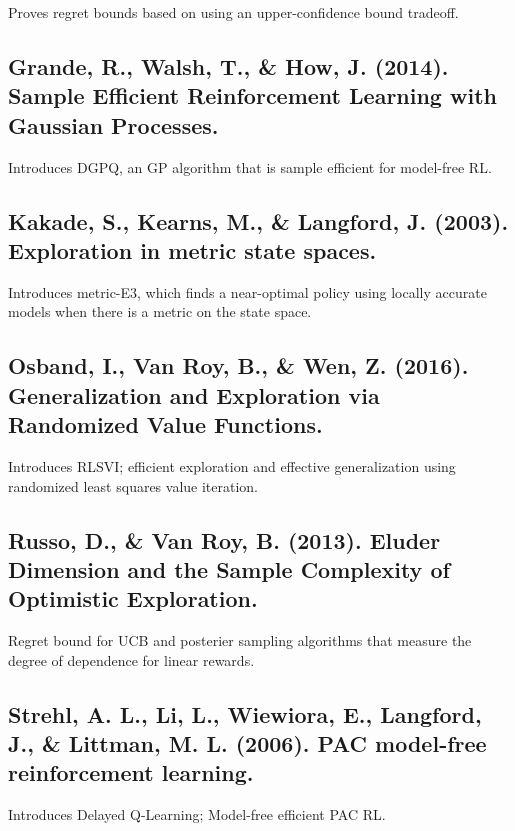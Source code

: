 \documentclass[12pt, oneside]{amsart}
\begin{document}
Proves regret bounds based on using an upper-confidence bound tradeoff.

\subsection*{Grande, R., Walsh, T., \& How, J. (2014). Sample Efficient Reinforcement Learning with Gaussian Processes.}
Introduces DGPQ, an GP algorithm that is sample efficient for model-free  RL.

\subsection*{Kakade, S., Kearns, M., \& Langford, J. (2003). Exploration in metric state spaces.}
Introduces metric-E3, which finds a near-optimal policy using locally accurate models when there is a metric on the state space.

\subsection*{Osband, I., Van Roy, B., \& Wen, Z. (2016). Generalization and Exploration via Randomized Value Functions.}
Introduces RLSVI; efficient exploration and effective generalization using randomized least squares value iteration.

\subsection*{Russo, D., \& Van Roy, B. (2013). Eluder Dimension and the Sample Complexity of Optimistic Exploration.}
Regret bound for UCB and posterier sampling algorithms that measure the degree of dependence for linear rewards.

\subsection*{Strehl, A. L., Li, L., Wiewiora, E., Langford, J., \& Littman, M. L. (2006). PAC model-free reinforcement learning.}
Introduces Delayed Q-Learning; Model-free efficient PAC RL.
	
\end{document}
